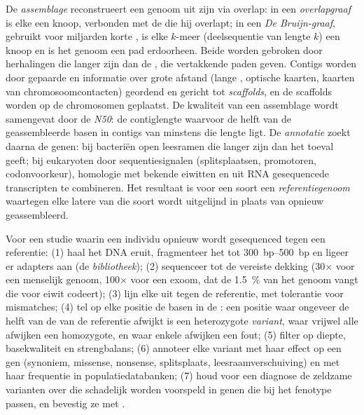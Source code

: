 \begin{definition}\label{def:b3:genomics:assembly}
De \emph{assemblage} reconstrueert een genoom uit zijn  via
overlap: in een \emph{overlapgraaf} is elke  een knoop, verbonden
met de  die hij overlapt; in een \emph{De Bruijn-graaf}, gebruikt
voor miljarden korte , is elke $k$-meer (deelsequentie van lengte
$k$) een knoop en is het genoom een pad erdoorheen. Beide worden
gebroken door herhalingen die langer zijn dan de , die vertakkende
paden geven. Contigs worden door gepaarde  en informatie over
grote afstand (lange , optische kaarten, kaarten van
chromosoomcontacten) geordend en gericht tot \emph{scaffolds}, en de
scaffolds worden op de chromosomen geplaatst. De kwaliteit van een
assemblage wordt samengevat door de \emph{N50}: de contiglengte
waarvoor de helft van de geassembleerde basen in contigs van minstens
die lengte ligt. De \emph{annotatie} zoekt daarna de genen: bij
bacteriën open leesramen die langer zijn dan het toeval geeft; bij
eukaryoten door sequentiesignalen (splitsplaatsen, promotoren,
codonvoorkeur), homologie met bekende eiwitten en uit RNA gesequencede
transcripten te combineren. Het resultaat is voor een soort een
\emph{referentiegenoom} waartegen elke latere  van die soort wordt
uitgelijnd in plaats van opnieuw geassembleerd.
\end{definition}

\begin{method}\label{met:b3:genomics:pipeline}
Voor een studie waarin een individu opnieuw wordt gesequenced tegen een
referentie: (1) haal het DNA eruit, fragmenteer het tot
\qtyrange{300}{500}{bp} en ligeer er adapters aan (de
\emph{bibliotheek}); (2) sequenceer tot de vereiste dekking
(30$\times$ voor een menselijk genoom, 100$\times$ voor een exoom, dat
de \qty{1.5}{\%} van het genoom vangt die voor eiwit codeert); (3) lijn
elke  uit tegen de referentie, met tolerantie voor mismatches;
(4) tel op elke positie de basen in de : een positie waar ongeveer
de helft van de  van de referentie afwijkt is een heterozygote
\emph{variant}, waar vrijwel alle  afwijken een homozygote, en
waar enkele  afwijken een fout; (5) filter op diepte,
basekwaliteit en strengbalans; (6) annoteer elke variant met haar
effect op een gen (synoniem, missense, nonsense, splitsplaats,
leesraamverschuiving) en met haar frequentie in populatiedatabanken;
(7) houd voor een diagnose de zeldzame varianten over die schadelijk
worden voorspeld in genen die bij het fenotype passen, en bevestig ze
met .
\end{method}

